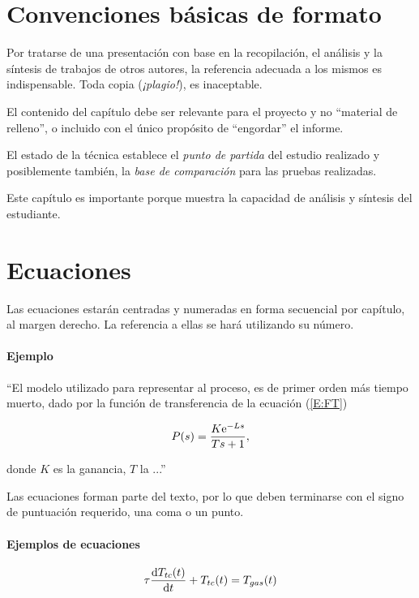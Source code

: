 \section{Convenciones básicas de formato}

Por tratarse de una presentación con base en la recopilación, el análisis y la síntesis de trabajos de otros autores, la referencia adecuada a los mismos es indispensable.  Toda copia (\emph{¡plagio!}), es inaceptable.

El contenido del capítulo debe ser relevante para el proyecto y no ``material de relleno'', o incluido con el único propósito de ``engordar'' el informe.

El estado de la técnica establece el \emph{punto de partida} del estudio realizado y posiblemente también, la \emph{base de comparación} para las pruebas realizadas.

Este capítulo es importante porque muestra la capacidad de análisis y síntesis del estudiante.
 
\section{Ecuaciones}

Las ecuaciones estarán centradas y numeradas en forma secuencial por capítulo, al margen derecho. La referencia a ellas se hará utilizando su número.

\paragraph{Ejemplo} ``El modelo utilizado para representar al proceso, es de primer orden más tiempo muerto, dado por la función de transferencia de la ecuación (\ref{E:FT})

\begin{equation}
	P(s) = \frac{K \mathrm{e}^{-Ls}}{Ts+1}, \label{E:FT}
\end{equation}

\noindent donde $K$ es la ganancia, $T$ la ...''  

Las ecuaciones forman parte del texto, por lo que deben terminarse con el signo de puntuación requerido, una coma o un punto.

\paragraph{Ejemplos de ecuaciones}

\begin{equation}
	\tau \frac{\mathrm{d} T_{tc}(t)}{\mathrm{d} t} + T_{tc}(t) = T_{gas}(t)
\end{equation}


